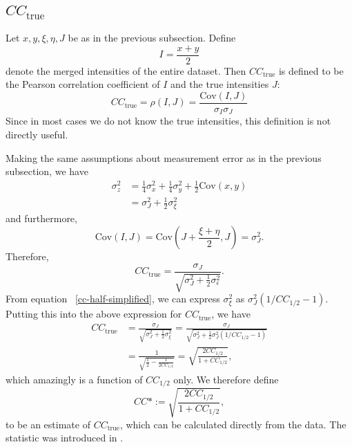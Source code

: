\documentclass[11pt,a4paper]{article}
\def\CChalf{CC_{1/2}}
\def\CCtrue{CC_{\mathrm{true}}}
\def\CCstar{CC\ast}
\def\cov{\mathrm{Cov}}
\begin{document}
\subsection{\boldmath$\CCtrue$}
Let $x, y, \xi, \eta, J$ be as in the previous subsection. Define
\begin{equation} I = \frac{x+y}{2} \end{equation}
denote the merged intensities of the entire dataset.
Then $\CCtrue$ is defined to be the Pearson correlation coefficient of $I$ and the true intensities $J$:
\begin{equation}
  \label{cc-true-definition}
  \CCtrue = \rho(I, J) = \frac{\cov(I, J)}{\sigma_I \sigma_J}
\end{equation}
Since in most cases we do not know the true intensities, this definition is not directly useful.

Making the same assumptions about measurement error as in the previous subsection, we have
\begin{align}
  \sigma^2_z &= \frac{1}{4} \sigma^2_x + \frac{1}{4}\sigma^2_y  + \frac{1}{2} \cov(x, y) \\
  &= \sigma_J^2 + \frac{1}{2} \sigma_\xi^2
\end{align}
and furthermore,
\begin{equation}
  \cov(I, J) = \cov(J + \frac{\xi+\eta}{2}, J) = \sigma^2_J.
\end{equation}
Therefore,
\begin{equation}
  \CCtrue = \frac{\sigma_J}{\sqrt{\sigma^2_J + \frac{1}{2}\sigma^2_\epsilon}}.
\end{equation}
From equation ~\ref{cc-half-simplified}, we can express $\sigma^2_\xi$ as $\sigma^2_J(1/\CChalf-1)$. Putting this into the above
expression for $\CCtrue$, we have
\begin{align}
  \CCtrue &= \frac{\sigma_J}{\sqrt{\sigma_J^2 + \frac{1}{2}\sigma^2_\xi}}
  = \frac{\sigma_J}{\sqrt{\sigma_J^2 + \frac{1}{2}\sigma^2_J(1/\CChalf-1)}} \\
  &= \frac{1}{\sqrt{\frac{1}{2}-\frac{1}{2 \CChalf}}}
  = \sqrt{\frac{2 \CChalf}{1+\CChalf}},
\end{align}
which amazingly is a function of $\CChalf$ only. We therefore define
\begin{equation}
  \label{cc-star-definition}
  \CCstar := \sqrt{\frac{2 \CChalf}{1+\CChalf}},
\end{equation}
to be an estimate of $\CCtrue$, which can be calculated directly from the data. The statistic was introduced in \cite{KaDi12}.
\end{document}
